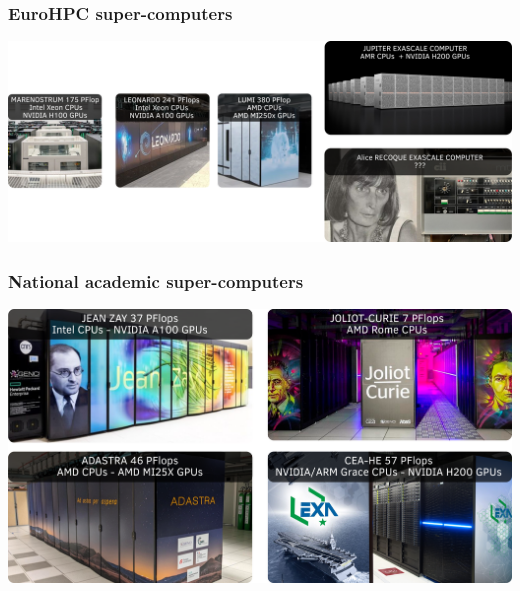 \documentclass[aspectratio=169]{beamer}
\begin{document}

\begin{frame}
\frametitle{EuroHPC super-computers}

\begin{center}
    \includegraphics[width=1\textwidth]{../../images/euroHPC.png}
\end{center}

\end{frame}


\begin{frame}
\frametitle{National academic super-computers}

\begin{center}
    \includegraphics[width=1\textwidth]{../../images/french_super_computers.png}
\end{center}

\end{frame}

\end{document}
